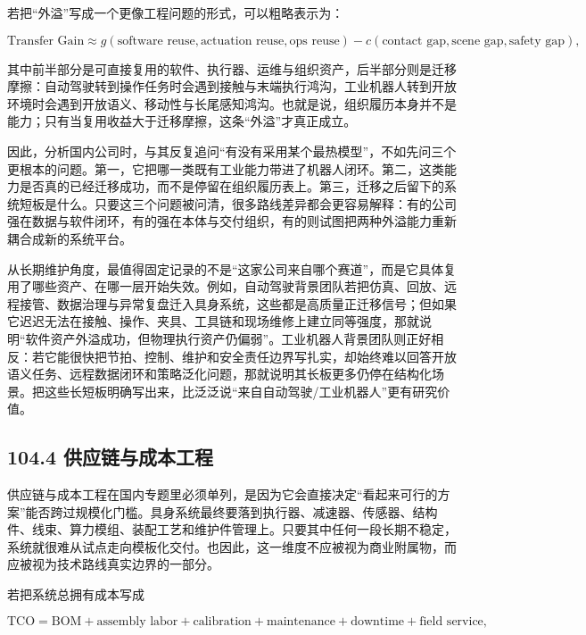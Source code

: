 若把“外溢”写成一个更像工程问题的形式，可以粗略表示为：

\begingroup
\scriptsize
\begin{equation*}
\text{Transfer Gain} \approx g(\text{software reuse}, \text{actuation reuse}, \text{ops reuse}) - c(\text{contact gap}, \text{scene gap}, \text{safety gap}),
\end{equation*}
\endgroup

其中前半部分是可直接复用的软件、执行器、运维与组织资产，后半部分则是迁移摩擦：自动驾驶转到操作任务时会遇到接触与末端执行鸿沟，工业机器人转到开放环境时会遇到开放语义、移动性与长尾感知鸿沟。也就是说，组织履历本身并不是能力；只有当复用收益大于迁移摩擦，这条“外溢”才真正成立。

因此，分析国内公司时，与其反复追问“有没有采用某个最热模型”，不如先问三个更根本的问题。第一，它把哪一类既有工业能力带进了机器人闭环。第二，这类能力是否真的已经迁移成功，而不是停留在组织履历表上。第三，迁移之后留下的系统短板是什么。只要这三个问题被问清，很多路线差异都会更容易解释：有的公司强在数据与软件闭环，有的强在本体与交付组织，有的则试图把两种外溢能力重新耦合成新的系统平台。

从长期维护角度，最值得固定记录的不是“这家公司来自哪个赛道”，而是它具体复用了哪些资产、在哪一层开始失效。例如，自动驾驶背景团队若把仿真、回放、远程接管、数据治理与异常复盘迁入具身系统，这些都是高质量正迁移信号；但如果它迟迟无法在接触、操作、夹具、工具链和现场维修上建立同等强度，那就说明“软件资产外溢成功，但物理执行资产仍偏弱”。工业机器人背景团队则正好相反：若它能很快把节拍、控制、维护和安全责任边界写扎实，却始终难以回答开放语义任务、远程数据闭环和策略泛化问题，那就说明其长板更多仍停在结构化场景。把这些长短板明确写出来，比泛泛说“来自自动驾驶/工业机器人”更有研究价值。

\subsection*{104.4 供应链与成本工程}


供应链与成本工程在国内专题里必须单列，是因为它会直接决定“看起来可行的方案”能否跨过规模化门槛。具身系统最终要落到执行器、减速器、传感器、结构件、线束、算力模组、装配工艺和维护件管理上。只要其中任何一段长期不稳定，系统就很难从试点走向模板化交付。也因此，这一维度不应被视为商业附属物，而应被视为技术路线真实边界的一部分。

若把系统总拥有成本写成

\begingroup
\scriptsize
\begin{equation*}
\text{TCO} =
\text{BOM} + \text{assembly labor} + \text{calibration} + \text{maintenance} + \text{downtime} + \text{field service},
\end{equation*}
\endgroup

